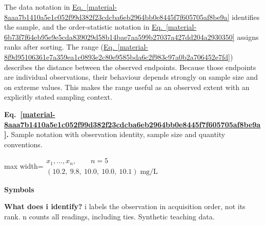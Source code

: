 \documentclass[11pt,a4paper]{article}
\begin{document}
\medskip

The data notation in \hyperref[material-8aaa7b1410a5e1c052f99d382f23cdcba6eb2964bb0e8445f7f605705af8be9a]{Eq.~\ref*{material-8aaa7b1410a5e1c052f99d382f23cdcba6eb2964bb0e8445f7f605705af8be9a}} identifies the sample, and the order-statistic notation in \hyperref[material-6b73f7f64eb95e9e5cda839029d58b14bae7aa599b27037a427dd204a2930350]{Eq.~\ref*{material-6b73f7f64eb95e9e5cda839029d58b14bae7aa599b27037a427dd204a2930350}} assigns ranks after sorting. The range (\hyperref[material-8f9d95106361e7a359ea1c0893e2c80e9585bda6c2f983c97a0b2a706452e7fd]{Eq.~\ref*{material-8f9d95106361e7a359ea1c0893e2c80e9585bda6c2f983c97a0b2a706452e7fd}}) describes the distance between the observed endpoints. Because those endpoints are individual observations, their behaviour depends strongly on sample size and on extreme values. This makes the range useful as an observed extent with an explicitly stated sampling context.


\par\medskip
\begin{samepage}
\label{material-8aaa7b1410a5e1c052f99d382f23cdcba6eb2964bb0e8445f7f605705af8be9a}
\noindent\textbf{Eq.~\ref*{material-8aaa7b1410a5e1c052f99d382f23cdcba6eb2964bb0e8445f7f605705af8be9a}.} Sample notation with observation identity, sample size and quantity conventions.\par\nopagebreak
\begin{center}\begin{adjustbox}{max width=\linewidth}$\displaystyle \begin{gathered}x_1,\ldots,x_n,\qquad n=5\\(10.2,\ 9.8,\ 10.0,\ 10.0,\ 10.1)\;\mathrm{mg/L}\end{gathered}$\end{adjustbox}\end{center}

\par\noindent\textbf{Symbols}

\par\noindent\textbf{What does i identify?} i labels the observation in acquisition order, not its rank. n counts all readings, including ties. Synthetic teaching data.

\end{samepage}
\medskip
\end{document}
